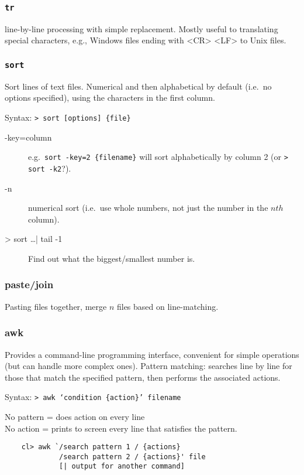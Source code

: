 \documentclass{article}
\begin{document}
\subsubsection{\texttt{tr}}
line-by-line
processing with simple replacement. Mostly useful to translating
special characters, e.g., Windows files ending with <CR> <LF> to Unix
files.

\subsubsection{\texttt{sort}}
Sort lines of text files.
Numerical and then alphabetical by default (i.e.\ no options
specified), using the characters in the first column.

Syntax: \texttt{> sort [options] \{file\}}
\begin{description}
    \item [-key=column] e.g.\ \texttt{sort -key=2 \{filename\}} will sort
        alphabetically by column 2 (or \texttt{> sort -k2}?).
    \item [-n] numerical sort (i.e.\ use whole numbers, not just the
        number in the $nth$ column).
    \item [> sort \ldots | tail -1] Find out what the biggest/smallest
        number is.
\end{description}

\subsubsection{paste/join}
Pasting files together, merge $n$ files based on line-matching.

\subsubsection{awk}
Provides a command-line programming interface, convenient for
simple operations (but can handle more complex ones).
Pattern matching: searches line by line for those that match the
specified pattern, then performs the associated actions.

Syntax: \texttt{> awk `condition \{action\}' filename}

No pattern = does action on every line\\
No action = prints to screen every line that satisfies the pattern.

\begin{verbatim}
    cl> awk `/search pattern 1 / {actions}
             /search pattern 2 / {actions}' file
             [| output for another command]
\end{verbatim}
\end{document}
